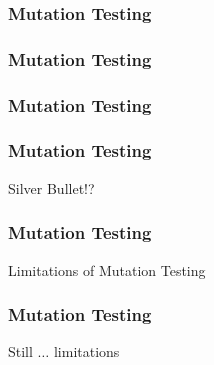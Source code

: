   \begin{frame}
    \frametitle{Mutation Testing}
    
    \begin{figure}[!htb]
    \centering
        \centering
        \vspace*{-3.5cm}
        {\fontsize{50}{50}}
    \end{figure}
    \end{frame}

  \begin{frame}
    \frametitle{Mutation Testing}
    
    \begin{figure}[!htb]
    \centering
        \centering
        \vspace*{-3.5cm}
        {\fontsize{50}{50}}
    \end{figure}
    \end{frame}

  \begin{frame}
    \frametitle{Mutation Testing}
    
    \begin{figure}[!htb]
    \centering
        \vspace*{-2.15cm}
        {\fontsize{50}{50}}
        
    \end{figure}
    \end{frame}

  \begin{frame}
    \frametitle{Mutation Testing}
    \centering
    {\HUGE Silver Bullet!?}
  \end{frame}

  \begin{frame}
    \frametitle{Mutation Testing}
    \centering
    {\HUGE Limitations of Mutation Testing}
  \end{frame}


  \begin{frame}
    \frametitle{Mutation Testing}
    \centering
    {\HUGE Still $\dots$ limitations}
  \end{frame}

